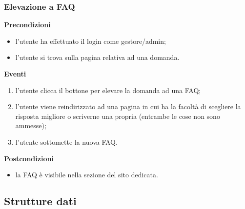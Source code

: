 \documentclass[a4paper, 14pt]{article}
\begin{document}
\begin{flushleft}
			\bigskip
			\subsubsection{Elevazione a FAQ}
			\textbf{Precondizioni}
			\begin{itemize}
				\item l'utente ha effettuato il login come gestore/admin;
				\item l'utente si trova sulla pagina relativa ad una domanda.
			\end{itemize}
			\textbf{Eventi}
			\begin{enumerate}
				\item l'utente clicca il bottone per elevare la domanda ad una FAQ;
				\item l'utente viene reindirizzato ad una pagina in cui ha la facoltà di scegliere la risposta
					  migliore o scriverne una propria (entrambe le cose non sono ammesse);
				\item l'utente sottomette la nuova FAQ.
			\end{enumerate}
			\textbf{Postcondizioni}
			\begin{itemize}
				\item la FAQ è visibile nella sezione del sito dedicata.
			\end{itemize}

		\subsection{Strutture dati}

\end{flushleft}
\end{document}
